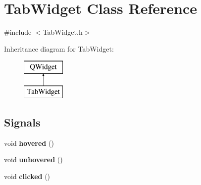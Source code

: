 \hypertarget{class_tab_widget}{}\section{Tab\+Widget Class Reference}
\label{class_tab_widget}


{\ttfamily \#include $<$Tab\+Widget.\+h$>$}

Inheritance diagram for Tab\+Widget\+:\begin{figure}[H]
\begin{center}
\leavevmode
\includegraphics[height=2.000000cm]{class_tab_widget}
\end{center}
\end{figure}
\subsection*{Signals}
\begin{DoxyCompactItemize}
\item 
\hypertarget{class_tab_widget_a45dd0b763c0110c535359c75a1636689}{}void {\bfseries hovered} ()\label{class_tab_widget_a45dd0b763c0110c535359c75a1636689}

\item 
\hypertarget{class_tab_widget_a11c66a7e717c4bfb4b2bb25712308f3b}{}void {\bfseries unhovered} ()\label{class_tab_widget_a11c66a7e717c4bfb4b2bb25712308f3b}

\item 
\hypertarget{class_tab_widget_a616dbbaf08c745779ebceed14e664b1e}{}void {\bfseries clicked} ()\label{class_tab_widget_a616dbbaf08c745779ebceed14e664b1e}

\end{DoxyCompactItemize}
